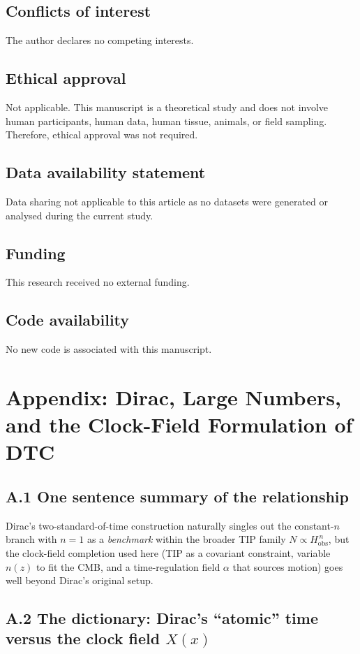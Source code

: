 \documentclass[12pt]{article}
\newcommand{\Hobs}{H_{\mathrm{obs}}}
\newcommand{\alphaReg}{\alpha}
\begin{document}
\subsection*{Conflicts of interest}
The author declares no competing interests.

\subsection*{Ethical approval}
Not applicable. This manuscript is a theoretical study and does not involve human participants, human data, human tissue, animals, or field sampling. Therefore, ethical approval was not required.

\subsection*{Data availability statement}
Data sharing not applicable to this article as no datasets were generated or analysed during the current study.

\subsection*{Funding}
This research received no external funding.

\subsection*{Code availability}
No new code is associated with this manuscript.



\section*{Appendix: Dirac, Large Numbers, and the Clock-Field Formulation of DTC}
\label{app:dirac}


\subsection*{A.1 One sentence summary of the relationship}
Dirac's two-standard-of-time construction naturally singles out the constant-$n$ branch with
$n=1$ as a \emph{benchmark} within the broader TIP family $N\propto \Hobs^{\,n}$, but the clock-field
completion used here (TIP as a covariant constraint, variable $n(z)$ to fit the CMB, and a
time-regulation field $\alphaReg$ that sources motion) goes well beyond Dirac's original setup.

\subsection*{A.2 The dictionary: Dirac's ``atomic'' time versus the clock field $X(x)$}
\end{document}
